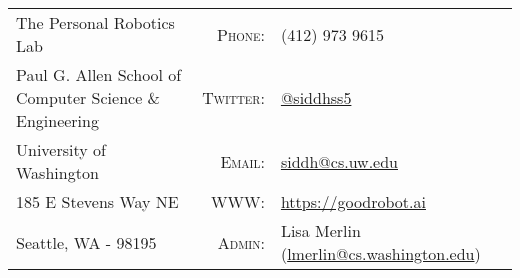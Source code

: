 
\begin{center}
\begin{tabular}{lrl}
The Personal Robotics Lab & \textsc{Phone:} & (412) 973 9615 \\
Paul G. Allen School of Computer Science \& Engineering& \textsc{Twitter:} & \href{https://twitter.com/siddhss5}{@siddhss5} \\
University of Washington& \textsc{Email:} & \url{siddh@cs.uw.edu}\\
185 E Stevens Way NE&  \textsc{WWW:} & \url{https://goodrobot.ai}\\
Seattle, WA - 98195 & \textsc{Admin:} & Lisa Merlin (\url{lmerlin@cs.washington.edu})
\end{tabular}
\end{center}
